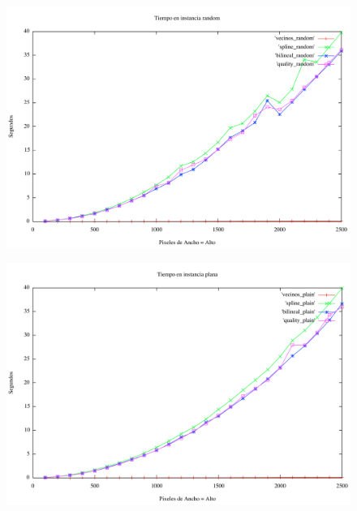 {\begin{figure}[h]
       \includegraphics[width=1\textwidth]{imagenes/tiempo_algoritmos_random.png}
\end{figure}

\newpage

\begin{figure}[h]
       \includegraphics[width=1\textwidth]{imagenes/tiempo_algoritmos_plain.png}
\end{figure}



}
